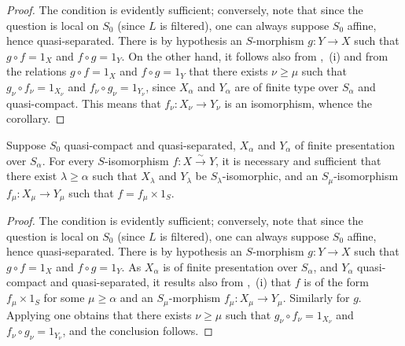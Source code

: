 \begin{proof}
The condition is evidently sufficient; conversely, note that since the question is local on $S_0$ (since $L$ is filtered), one can always suppose $S_0$ affine, hence quasi-separated.
There is by hypothesis an $S$-morphism $g:Y\to X$ such that $g\circ f=1_X$ and $f\circ g=1_Y$.
On the other hand, it follows also from ,~(i) and from the relations $g\circ f=1_X$ and $f\circ g=1_Y$ that there exists $\nu\geqslant\mu$ such that $g_\nu\circ f_\nu=1_{X_\nu}$ and $f_\nu\circ g_\nu=1_{Y_\nu}$, since $X_\alpha$ and $Y_\alpha$ are of finite type over $S_\alpha$ and quasi-compact.
This means that $f_\nu:X_\nu\to Y_\nu$ is an isomorphism, whence the corollary.
\end{proof}

\begin{corollary}[8.8.5]
\label{IV.8.8.5}
Suppose $S_0$ quasi-compact and quasi-separated, $X_\alpha$ and $Y_\alpha$ of finite presentation over $S_\alpha$.
For every $S$-isomorphism $f:X\xrightarrow{\sim}Y$, it is necessary and sufficient that there exist $\lambda\geqslant\alpha$ such that $X_\lambda$ and $Y_\lambda$ be $S_\lambda$-isomorphic, and an $S_\mu$-isomorphism $f_\mu:X_\mu\to Y_\mu$ such that $f=f_\mu\times 1_S$.
\end{corollary}

\begin{proof}
The condition is evidently sufficient; conversely, note that since the question is local on $S_0$ (since $L$ is filtered), one can always suppose $S_0$ affine, hence quasi-separated.
There is by hypothesis an $S$-morphism $g:Y\to X$ such that $g\circ f=1_X$ and $f\circ g=1_Y$.
As $X_\alpha$ is of finite presentation over $S_\alpha$, and $Y_\alpha$ quasi-compact and quasi-separated, it results also from ,~(i) that $f$ is of the form $f_\mu\times 1_S$ for some $\mu\geqslant\alpha$ and an $S_\mu$-morphism $f_\mu:X_\mu\to Y_\mu$.
Similarly for $g$.
Applying  one obtains that there exists $\nu\geqslant\mu$ such that $g_\nu\circ f_\nu=1_{X_\nu}$ and $f_\nu\circ g_\nu=1_{Y_\nu}$, and the conclusion follows.
\end{proof}

